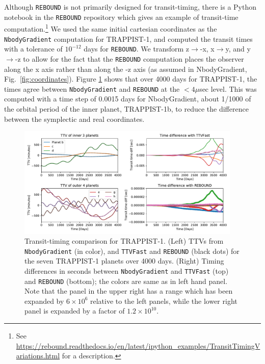 \documentclass[fleqn,usenatbib,twocolumn]{mnras}
\begin{document}
Although \texttt{REBOUND} is not primarily designed for transit-timing, there is a Python notebook in the \texttt{REBOUND} repository which gives an example of transit-time computation.\footnote{See \url{https://rebound.readthedocs.io/en/latest/ipython_examples/TransitTimingVariations.html} for a description.}  We used the same initial cartesian coordinates as the \texttt{NbodyGradient} computation for TRAPPIST-1, and computed the transit times with a tolerance of $10^{-12}$ days for \texttt{REBOUND}.  We transform z$\rightarrow$-x, x$\rightarrow$y, and y$\rightarrow$-z to allow for the fact that the \texttt{REBOUND} computation places the observer along the x axis rather than along the -z axis (as assumed in NbodyGradient, Fig.\ \ref{fig:coordinates}).   Figure \ref{fig:timing_comparison2} shows that over 4000 days for TRAPPIST-1, the times agree between \texttt{NbodyGradient} and \texttt{REBOUND} at the  $<4\mu$sec level.  This was computed with a time step of 0.0015 days for NbodyGradient, about 1/1000 of the orbital period of the inner planet, TRAPPIST-1b, to reduce the difference between the symplectic and real coordinates.

\begin{figure}
    \centering
    \includegraphics[width=0.95\textwidth]{nbg_vs_ttvfast_vs_rebound_transit_times.pdf}
    \caption{Transit-timing comparison for TRAPPIST-1.  (Left) TTVs from \texttt{NbodyGradient} (in color), and \texttt{TTVFast} and \texttt{REBOUND} (black dots) for the seven TRAPPIST-1 planets over 4000 days.  (Right) Timing differences in seconds between \texttt{NbodyGradient} and \texttt{TTVFast} (top) and \texttt{REBOUND} (bottom); the colors are same as in left hand panel. Note that the panel in the upper right has a range which has been expanded by  $6\times 10^6$ relative to the left panels, while the lower right panel is expanded by a factor of $1.2\times 10^{10}$.
    }
    \label{fig:timing_comparison2}
\end{figure}
\end{document}
